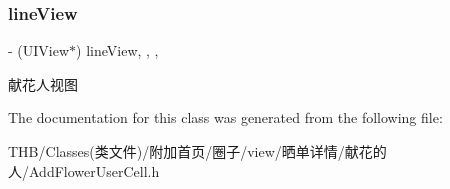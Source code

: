 \subsubsection{\texorpdfstring{line\+View}{lineView}}
{\footnotesize\ttfamily -\/ (U\+I\+View$\ast$) line\+View\hspace{0.3cm}{\ttfamily [read]}, {\ttfamily [write]}, {\ttfamily [nonatomic]}, {\ttfamily [strong]}}

献花人视图 

The documentation for this class was generated from the following file\+:\begin{DoxyCompactItemize}
\item 
T\+H\+B/\+Classes(类文件)/附加首页/圈子/view/晒单详情/献花的人/Add\+Flower\+User\+Cell.\+h\end{DoxyCompactItemize}
